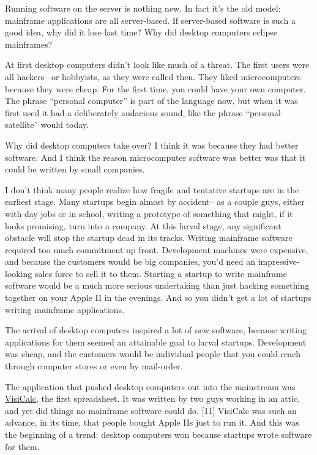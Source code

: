 Running software on the server is nothing new. In fact it's the old
model: mainframe applications are all server-based. If server-based
software is such a good idea, why did it lose last time? Why did desktop
computers eclipse mainframes?

At first desktop computers didn't look like much of a threat. The first
users were all hackers-- or hobbyists, as they were called then. They
liked microcomputers because they were cheap. For the first time, you
could have your own computer. The phrase ``personal computer'' is part
of the language now, but when it was first used it had a deliberately
audacious sound, like the phrase ``personal satellite'' would today.

Why did desktop computers take over? I think it was because they had
better software. And I think the reason microcomputer software was
better was that it could be written by small companies.

I don't think many people realize how fragile and tentative startups are
in the earliest stage. Many startups begin almost by accident-- as a
couple guys, either with day jobs or in school, writing a prototype of
something that might, if it looks promising, turn into a company. At
this larval stage, any significant obstacle will stop the startup dead
in its tracks. Writing mainframe software required too much commitment
up front. Development machines were expensive, and because the customers
would be big companies, you'd need an impressive-looking sales force to
sell it to them. Starting a startup to write mainframe software would be
a much more serious undertaking than just hacking something together on
your Apple II in the evenings. And so you didn't get a lot of startups
writing mainframe applications.

The arrival of desktop computers inspired a lot of new software, because
writing applications for them seemed an attainable goal to larval
startups. Development was cheap, and the customers would be individual
people that you could reach through computer stores or even by
mail-order.

The application that pushed desktop computers out into the mainstream
was \href{http://www.bricklin.com/visicalc.htm}{VisiCalc}, the first
spreadsheet. It was written by two guys working in an attic, and yet did
things no mainframe software could do. {[}11{]} VisiCalc was such an
advance, in its time, that people bought Apple IIs just to run it. And
this was the beginning of a trend: desktop computers won because
startups wrote software for them.

